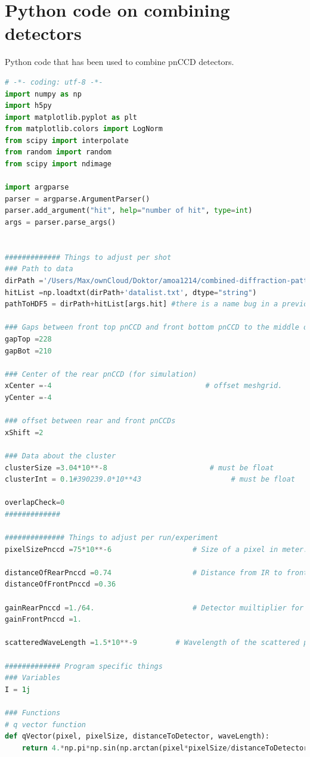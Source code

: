 \section{Python code on combining detectors}
Python code that has been used to combine pnCCD detectors.
\begin{lstlisting}[language=Python,frame=single,basicstyle=\footnotesize]
# -*- coding: utf-8 -*-
import numpy as np
import h5py
import matplotlib.pyplot as plt
from matplotlib.colors import LogNorm
from scipy import interpolate
from random import random
from scipy import ndimage

import argparse
parser = argparse.ArgumentParser()
parser.add_argument("hit", help="number of hit", type=int)
args = parser.parse_args()


############# Things to adjust per shot
### Path to data
dirPath ='/Users/Max/ownCloud/Doktor/amoa1214/combined-diffraction-patterns/r0108'+'/'             # NO "/"" at the end
hitList =np.loadtxt(dirPath+'datalist.txt', dtype="string")
pathToHDF5 = dirPath+hitList[args.hit] #there is a name bug in a previous piece of code.

### Gaps between front top pnCCD and front bottom pnCCD to the middle of the rear pnCCD.
gapTop =228
gapBot =210

### Center of the rear pnCCD (for simulation)                           
xCenter =-4                                    # offset meshgrid.
yCenter =-4

### offset between rear and front pnCCDs 
xShift =2

### Data about the cluster
clusterSize =3.04*10**-8                        # must be float
clusterInt = 0.1#390239.0*10**43                     # must be float

overlapCheck=0
############# 

############## Things to adjust per run/experiment
pixelSizePnccd =75*10**-6 					# Size of a pixel in meter.

distanceOfRearPnccd =0.74					# Distance from IR to front pnCCD in meter.
distanceOfFrontPnccd =0.36			

gainRearPnccd =1./64.						# Detector muiltiplier for gain calibration.
gainFrontPnccd =1.

scatteredWaveLength =1.5*10**-9			# Wavelength of the scattered photons in meter.

############# Program specific things
### Variables
I = 1j

### Functions
# q vector function
def qVector(pixel, pixelSize, distanceToDetector, waveLength):
	return 4.*np.pi*np.sin(np.arctan(pixel*pixelSize/distanceToDetector)/2.)/waveLength


\end{lstlisting}

